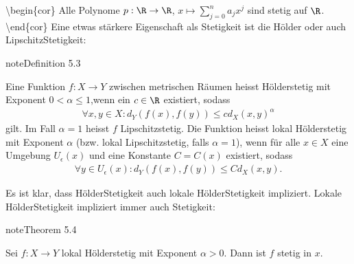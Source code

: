 \documentclass[letterpaper,10pt,english]{jupyterBook}
\begin{document}
\textbackslash{}begin\{cor\}
Alle Polynome \(p: \R  \rightarrow \R\), \( x \mapsto \sum_{j=0}^n a_j x^j\) sind stetig auf \(\R\).
\textbackslash{}end\{cor\}
Eine etwas stärkere Eigenschaft als Stetigkeit ist die Hölder\sphinxhyphen{} oder auch Lipschitz\sphinxhyphen{}Stetigkeit:
\label{stetigkeit/stetigkeit:definition-7}
\begin{sphinxadmonition}{note}{Definition 5.3}



Eine Funktion \(f: X \rightarrow Y\) zwischen metrischen Räumen heisst Hölder\sphinxhyphen{}stetig mit Exponent \(0 < \alpha \leq 1\),wenn ein \(c \in \R\) existiert, sodass
\begin{equation*}
\begin{split} \forall x,y \in X: d_Y(f(x),f(y)) \leq c d_X(x,y)^\alpha\end{split}
\end{equation*}
gilt. Im Fall \(\alpha = 1\) heisst \(f\) Lipschitz\sphinxhyphen{}stetig.
Die Funktion heisst lokal Hölder\sphinxhyphen{}stetig mit Exponent \(\alpha\) (bzw. lokal Lipschitz\sphinxhyphen{}stetig, falls \(\alpha =1\)), wenn für alle \(x \in X\) eine Umgebung \(U_\epsilon(x)\) und eine Konstante \(C=C(x)\) existiert, sodass
\begin{equation*}
\begin{split} \forall y \in U_\epsilon(x): d_Y(f(x),f(y)) \leq C d_X(x,y) .\end{split}
\end{equation*}\end{sphinxadmonition}

Es ist klar, dass Hölder\sphinxhyphen{}Stetigkeit auch lokale Hölder\sphinxhyphen{}Stetigkeit impliziert. Lokale Hölder\sphinxhyphen{}Stetigkeit impliziert immer auch Stetigkeit:
\label{stetigkeit/stetigkeit:theorem-8}
\begin{sphinxadmonition}{note}{Theorem 5.4}



Sei \(f: X \rightarrow Y\) lokal Hölder\sphinxhyphen{}stetig mit Exponent \(\alpha > 0\). Dann ist \(f\) stetig in \(x\).
\end{sphinxadmonition}
\end{document}
